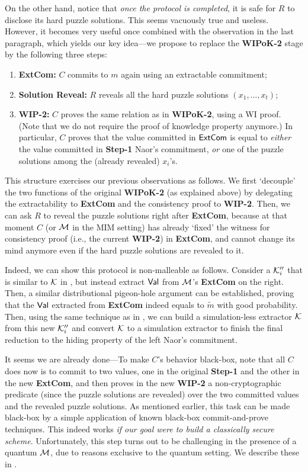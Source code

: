 On the other hand, notice that {\em once the protocol is completed}, it is safe for $R$ to disclose its hard puzzle solutions. This seems vacuously true and useless. However, it becomes very useful once combined with the observation in the last paragraph, which yields our key idea---we propose to replace the {\bf WIPoK-2} stage by the following three steps:
\begin{enumerate}
\item 
{\bf ExtCom:} $C$ commits to $m$ again using an extractable commitment;
\item
{\bf Solution Reveal:} $R$ reveals all the hard puzzle solutions $(x_1, \ldots, x_t)$;
\item
{\bf WIP-2:} $C$ proves the same relation as in \cite{FOCS:LPY23} {\bf WIPoK-2}, using a WI proof. (Note that we do not require the proof of knowledge property anymore.) In particular, $C$ proves that the value committed in $\mathsf{ExtCom}$ is equal to {\em either} the value committed in {\bf Step-1} Naor's commitment, {\em or} one of the puzzle solutions among the (already revealed) $x_i$'s.
\end{enumerate}
This structure exercises our previous observations as follows. We first `decouple' the two functions of the original {\bf WIPoK-2} (as explained above) by delegating the extractability to {\bf ExtCom} and the consistency proof to {\bf WIP-2}. Then, we can ask $R$ to reveal the puzzle solutions right after {\bf ExtCom}, because at that moment $C$ (or $\mathcal{M}$ in the MIM setting) has already `fixed' the witness for consistency proof (i.e., the current {\bf WIP-2}) in {\bf ExtCom}, and cannot change its mind anymore even if the hard puzzle solutions are revealed to it. 

Indeed, we can show this protocol is non-malleable as follows. Consider a $\mathcal{K}''_i$ that is similar to $\mathcal{K}$ in , but instead extract $\mathsf{Val}$ from $\mathcal{M}$'s {\bf ExtCom} on the right. Then, a similar distributional pigeon-hole argument can be established, proving that the $\mathsf{Val}$ extracted from {\bf ExtCom} indeed equals to $\tilde{m}$ with good probability. Then, using the same technique as in \cite{FOCS:LPY23}, we can build a simulation-less extractor $\mathcal{K}$ from this new $\mathcal{K}''_i$ and convert $\mathcal{K}$ to a simulation extractor to finish the final reduction to the hiding property of the left Naor's commitment.

It seems we are already done---To make $C$'s behavior black-box, note that all $C$ does now is to commit to two values, one in the original {\bf Step-1} and the other in the new {\bf ExtCom}, and then proves in the new {\bf WIP-2} a non-cryptographic predicate (since the puzzle solutions are revealed) over the two committed values and the revealed puzzle solutions. As mentioned earlier, this task can be made black-box by a simple application of known black-box commit-and-prove techniques. This indeed works {\em if our goal were to build a classically secure scheme}. Unfortunately, this step turns out to be challenging in the presence of a quantum $\mathcal{M}$, due to reasons exclusive to the quantum setting. We describe these in .






